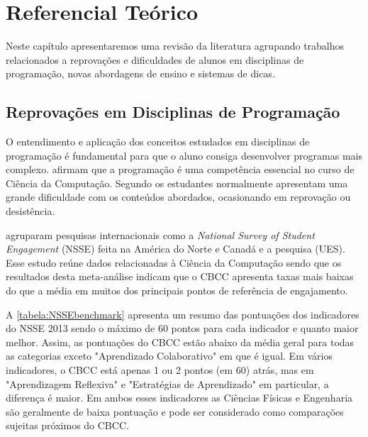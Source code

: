 \chapter{Referencial Teórico}
Neste capítulo apresentaremos uma revisão da literatura agrupando trabalhos relacionados a reprovações e dificuldades de alunos em disciplinas de programação, novas abordagens de ensino e sistemas de dicas. 

\section{Reprovações em Disciplinas de Programação}

O entendimento e aplicação dos conceitos estudados em disciplinas de programação é fundamental para que o aluno consiga desenvolver programas mais complexo.  afirmam que a programação é uma competência essencial no curso de Ciência da Computação. Segundo  os estudantes normalmente apresentam uma grande dificuldade com os conteúdos abordados, ocasionando em reprovação ou desistência.

 agruparam pesquisas internacionais como a \textit{National Survey of Student Engagement} (NSSE) feita na América do Norte e Canadá e a pesquisa  (UES). Esse estudo reúne dados relacionadas à Ciência da Computação sendo que os resultados desta meta-análise indicam que o CBCC apresenta taxas mais baixas do que a média em muitos dos principais pontos de referência de engajamento. 

A \cref{tabela:NSSEbenchmark} apresenta um resumo das pontuações dos indicadores do NSSE 2013 sendo o máximo de 60 pontos para cada indicador e quanto maior melhor. Assim, as pontuações do CBCC estão abaixo da média geral para todas as categorias exceto "Aprendizado Colaborativo" em que é igual. Em vários indicadores, o CBCC está apenas 1 ou 2 pontos (em 60) atrás, mas em "Aprendizagem Reflexiva" e "Estratégias de Aprendizado" em particular, a diferença é maior. Em ambos esses indicadores as Ciências Físicas e Engenharia são geralmente de baixa pontuação e pode ser considerado como comparações sujeitas próximos do CBCC. 

